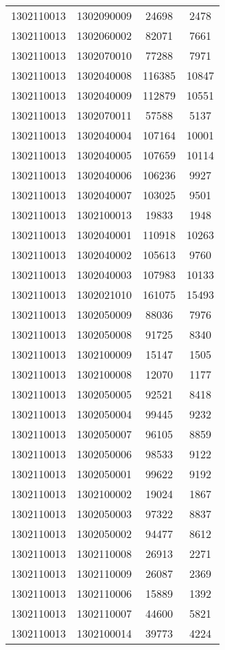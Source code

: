 \begin{longtable}[h]{llcc}
		1302110013 & 1302090009 & 24698 & 2478\\
		1302110013 & 1302060002 & 82071 & 7661\\
		1302110013 & 1302070010 & 77288 & 7971\\
		1302110013 & 1302040008 & 116385 & 10847\\
		1302110013 & 1302040009 & 112879 & 10551\\
		1302110013 & 1302070011 & 57588 & 5137\\
		1302110013 & 1302040004 & 107164 & 10001\\
		1302110013 & 1302040005 & 107659 & 10114\\
		1302110013 & 1302040006 & 106236 & 9927\\
		1302110013 & 1302040007 & 103025 & 9501\\
		1302110013 & 1302100013 & 19833 & 1948\\
		1302110013 & 1302040001 & 110918 & 10263\\
		1302110013 & 1302040002 & 105613 & 9760\\
		1302110013 & 1302040003 & 107983 & 10133\\
		1302110013 & 1302021010 & 161075 & 15493\\
		1302110013 & 1302050009 & 88036 & 7976\\
		1302110013 & 1302050008 & 91725 & 8340\\
		1302110013 & 1302100009 & 15147 & 1505\\
		1302110013 & 1302100008 & 12070 & 1177\\
		1302110013 & 1302050005 & 92521 & 8418\\
		1302110013 & 1302050004 & 99445 & 9232\\
		1302110013 & 1302050007 & 96105 & 8859\\
		1302110013 & 1302050006 & 98533 & 9122\\
		1302110013 & 1302050001 & 99622 & 9192\\
		1302110013 & 1302100002 & 19024 & 1867\\
		1302110013 & 1302050003 & 97322 & 8837\\
		1302110013 & 1302050002 & 94477 & 8612\\
		1302110013 & 1302110008 & 26913 & 2271\\
		1302110013 & 1302110009 & 26087 & 2369\\
		1302110013 & 1302110006 & 15889 & 1392\\
		1302110013 & 1302110007 & 44600 & 5821\\
		1302110013 & 1302100014 & 39773 & 4224\\

\end{longtable}
